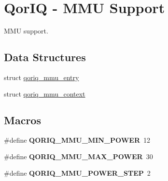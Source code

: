 \hypertarget{group__QorIQMMU}{}\section{Qor\+IQ -\/ M\+MU Support}
\label{group__QorIQMMU}


M\+MU support.  


\subsection*{Data Structures}
\begin{DoxyCompactItemize}
\item 
struct \mbox{\hyperlink{structqoriq__mmu__entry}{qoriq\+\_\+mmu\+\_\+entry}}
\item 
struct \mbox{\hyperlink{structqoriq__mmu__context}{qoriq\+\_\+mmu\+\_\+context}}
\end{DoxyCompactItemize}
\subsection*{Macros}
\begin{DoxyCompactItemize}
\item 
\mbox{\label{group__QorIQMMU_gaff31cad73bbd615bdd567466a8cfed53}} 
\#define {\bfseries Q\+O\+R\+I\+Q\+\_\+\+M\+M\+U\+\_\+\+M\+I\+N\+\_\+\+P\+O\+W\+ER}~12
\item 
\mbox{\label{group__QorIQMMU_gaa27a9aca26e0dec99663974c8746dce2}} 
\#define {\bfseries Q\+O\+R\+I\+Q\+\_\+\+M\+M\+U\+\_\+\+M\+A\+X\+\_\+\+P\+O\+W\+ER}~30
\item 
\mbox{\label{group__QorIQMMU_ga28f4c7a4d870b25d07a1feb7282d0e4f}} 
\#define {\bfseries Q\+O\+R\+I\+Q\+\_\+\+M\+M\+U\+\_\+\+P\+O\+W\+E\+R\+\_\+\+S\+T\+EP}~2
\end{DoxyCompactItemize}
